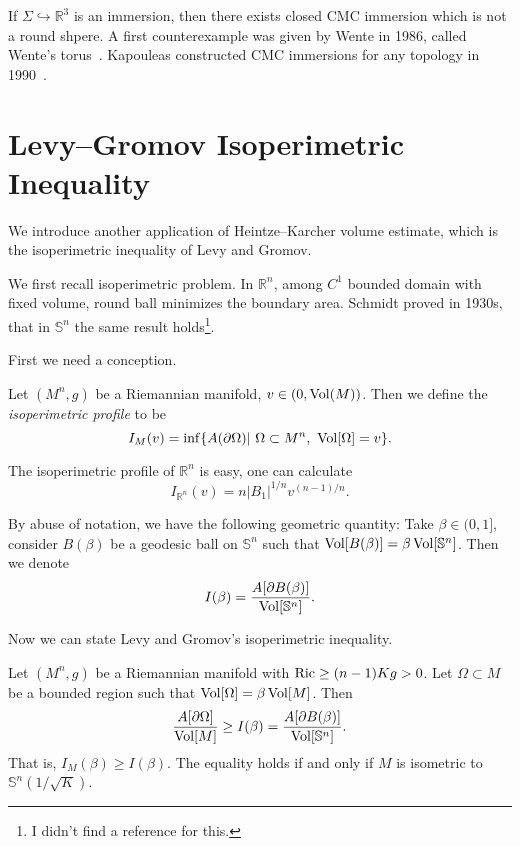 \begin{rem}
    If $\Sigma\hookrightarrow\mathbb{R}^3$ is an immersion, then there exists closed CMC immersion which is not a round shpere.
    A first counterexample was given by Wente in 1986, called Wente's torus~\cite{Wente}.
    Kapouleas constructed CMC immersions for any topology in 1990~\cite{Kapouleas}.
\end{rem}

\section{Levy--Gromov Isoperimetric Inequality}

We introduce another application of Heintze--Karcher volume estimate, which is the isoperimetric inequality of Levy and Gromov.

We first recall isoperimetric problem.
In $\mathbb{R}^n$, among $C^1$ bounded domain with fixed volume, round ball minimizes the boundary area.
Schmidt proved in 1930s, that in $\mathbb{S}^n$ the same result holds\footnote{I didn't find a reference for this.}.

First we need a conception.
\begin{defn}
    Let $(M^n,g)$ be a Riemannian manifold, $v\in(0,\operatorname{Vol}(M))$.
    Then we define the \emph{isoperimetric profile} to be
    \[I_M(v)=\inf\{A(\partial\Omega)|\ \Omega\subset M^n,\ \operatorname{Vol}[\Omega]=v\}.\]
\end{defn}
\begin{eg}
    The isoperimetric profile of $\mathbb{R}^n$ is easy, one can calculate
    \[I_{\mathbb{R}^n}(v)=n|B_1|^{1/n}v^{(n-1)/n}.\]
\end{eg}

By abuse of notation, we have the following geometric quantity:
Take $\beta\in(0,1]$, consider $B(\beta)$ be a geodesic ball on $\mathbb{S}^n$ such that $\operatorname{Vol}[B(\beta)]=\beta\operatorname{Vol}[\mathbb{S}^n]$.
Then we denote
\[I(\beta)=\frac{A[\partial B(\beta)]}{\operatorname{Vol}[\mathbb{S}^n]}.\]

Now we can state Levy and Gromov's isoperimetric inequality.
\begin{thm}\label{Levy Gromov}
    Let $(M^n,g)$ be a Riemannian manifold with $\operatorname{Ric}\geq(n-1)Kg>0$.
    Let $\Omega\subset M$ be a bounded region such that $\operatorname{Vol}[\Omega]=\beta\operatorname{Vol}[M]$.
    Then
    \[\frac{A[\partial\Omega]}{\operatorname{Vol}[M]}\geq I(\beta)=\frac{A[\partial B(\beta)]}{\operatorname{Vol}[\mathbb{S}^n]}.\]
    That is, $I_M(\beta)\geq I(\beta)$.
    The equality holds if and only if $M$ is isometric to $\mathbb{S}^n(1/\sqrt{K})$.
\end{thm}

